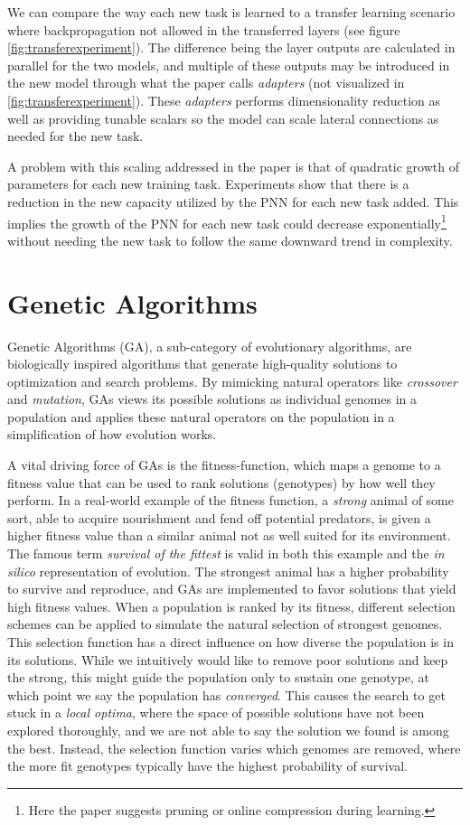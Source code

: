 We can compare the way each new task is learned to a transfer learning scenario where backpropagation not allowed in the transferred layers (see figure \ref{fig:transferexperiment}). The difference being the layer outputs are calculated in parallel for the two models, and multiple of these outputs may be introduced in the new model through what the paper calls \textit{adapters} (not visualized in \ref{fig:transferexperiment}). These \textit{adapters} performs dimensionality reduction as well as providing tunable scalars so the model can scale lateral connections as needed for the new task.

A problem with this scaling addressed in the paper is that of quadratic growth of parameters for each new training task. Experiments show that there is a reduction in the new capacity utilized by the PNN for each new task added. This implies the growth of the PNN for each new task could decrease exponentially\footnote{Here the paper suggests pruning or online compression during learning.} without needing the new task to follow the same downward trend in complexity. 

\section{Genetic Algorithms}
\label{background:GA}
Genetic Algorithms\cite{GAbook} (GA), a sub-category of evolutionary algorithms,  are biologically inspired algorithms that generate high-quality solutions to optimization and search problems. By mimicking natural operators like \textit{crossover} and \textit{mutation}, GAs views its possible solutions as individual genomes in a population and applies these natural operators on the population in a simplification of how evolution works. 

A vital driving force of GAs is the fitness-function, which maps a genome to a fitness value that can be used to rank solutions (genotypes) by how well they perform. In a real-world example of the fitness function, a \textit{strong} animal of some sort, able to acquire nourishment and fend off potential predators, is given a higher fitness value than a similar animal not as well suited for its environment. The famous term \textit{survival of the fittest} is valid in both this example and the \textit{in silico} representation of evolution. The strongest animal has a higher probability to survive and reproduce, and GAs are implemented to favor solutions that yield high fitness values.  
When a population is ranked by its fitness, different selection schemes can be applied to simulate the natural selection of strongest genomes. This selection function has a direct influence on how diverse the population is in its solutions. While we intuitively would like to remove poor solutions and keep the strong, this might guide the population only to sustain one genotype, at which point we say the population has \textit{converged}. This causes the search to get stuck in a \textit{local optima}, where the space of possible solutions have not been explored thoroughly, and we are not able to say the solution we found is among the best. Instead, the selection function varies which genomes are removed, where the more fit genotypes typically have the highest probability of survival. 

